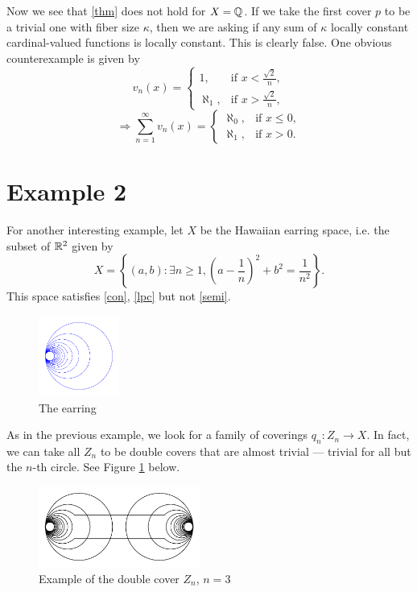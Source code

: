 \documentclass{article}
\begin{document}
Now we see that \ref{thm} does not hold for $X=\mathbb{Q}$. If we take the first cover $p$ to be a trivial one with fiber size $\kappa$, then we are asking if any sum of $\kappa$ locally constant cardinal-valued functions is locally constant. This is clearly false. One obvious counterexample is given by
\[
    v_n(x) = \begin{cases}
        1, & \text{if } x<\frac{\sqrt{2}}{n}, \\
        \aleph_1, & \text{if } x>\frac{\sqrt{2}}{n},
    \end{cases}
\]
\[
    \Longrightarrow \sum_{n=1}^\infty v_n(x) = \begin{cases}
        \aleph_0, & \text{if } x\leq 0, \\
        \aleph_1, & \text{if } x>0.
    \end{cases}
\]

\section{Example 2}

For another interesting example, let $X$ be the Hawaiian earring space, i.e. the subset of $\mathbb{R}^2$ given by
\[
    X = \left\{(a,b):\exists n\geq 1, \left(a-\frac{1}{n}\right)^2+b^2=\frac{1}{n^2}\right\}.
\]
This space satisfies \ref{con}, \ref{lpc} but not \ref{semi}. 

\begin{figure}[ht!]
    \centering
    \includegraphics[height=100px]{../figures/hawaiian_earring.pdf}
    \caption{The earring}
\end{figure}

As in the previous example, we look for a family of coverings $q_n:Z_n\longrightarrow X$. In fact, we can take all $Z_n$ to be double covers that are almost trivial --- trivial for all but the $n$-th circle. See Figure \ref{fig:2cover} below.

\begin{figure}[ht!]
    \centering
    \includegraphics[height=100px]{../figures/hawaiian_earring_2cover.pdf}
    \caption{Example of the double cover $Z_n$, $n=3$}
    \label{fig:2cover}
\end{figure}
\end{document}
